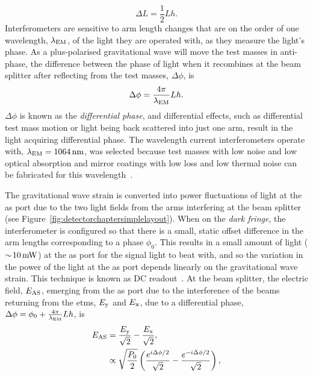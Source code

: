 \begin{equation}
\Delta L = \frac{1}{2}Lh.
\end{equation}
Interferometers are sensitive to arm length changes that are on the order of one wavelength, $\lambda_{\rm{EM}}$, of the light they are operated with, as they measure the light's phase. As a plus-polarised gravitational wave will move the test masses in anti-phase, the difference between the phase of light when it recombines at the beam splitter after reflecting from the test masses, $\Delta \phi$, is
\begin{equation}
\Delta \phi = \frac{4\pi}{\lambda_{\rm{EM}}} Lh.
\label{eq:detector_chapter_simple_michleson}
\end{equation}
$\Delta \phi$ is known as the \emph{differential phase}, and differential effects, such as differential test mass motion or light being back scattered into just one arm, result in the light acquiring differential phase. The wavelength current interferometers operate with, $\lambda_{\rm{EM}} = 1064\,\si{\nano\meter}$, was selected because test masses with low noise and low optical absorption and mirror coatings with low loss and low thermal noise can be fabricated for this wavelength~\cite{Harry2006}.
\par
The gravitational wave strain is converted into power fluctuations of light at the \gls{as} port due to the two light fields from the arms interfering at the beam splitter (see Figure~\ref{fig:detectorchaptersimplelayout}). When on the \emph{dark fringe}, the interferometer is configured so that there is a small, static offset difference in the arm lengths corresponding to a phase $\phi_0$. This results in a small amount of light ($\sim\!10\,\rm{mW}$) at the \gls{as} port for the signal light to beat with, and so the variation in the power of the light at the \gls{as} port depends linearly on the gravitational wave strain. This technique is known as DC readout~\cite{Hild2009,Fricke2012}. At the beam splitter, the electric field, $E_{\rm{AS}}$, emerging from the \gls{as} port due to the interference of the beams returning from the \glspl{etm}, $E_{\rm{y}}$ and $E_{\rm{x}}$, due to a differential phase, $\Delta\phi = \phi_0 + \frac{4\pi}{\lambda_{\rm{EM}}} Lh$, is
\begin{align}
E_{\rm{AS}} &= \frac{E_{\rm{y}}}{\sqrt{2}} - \frac{E_{\rm{x}}}{\sqrt{2}}, \\
& \propto \sqrt{\frac{P_0}{2}} \left( \frac{e^{ i\Delta\phi/2 }}{\sqrt{2}} - \frac{e^{ -i\Delta\phi/2 }}{\sqrt{2}} \right),
\end{align}
